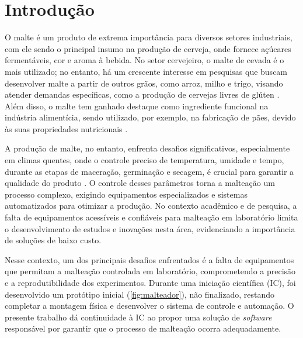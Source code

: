 \chapter[Introdução]{Introdução}

O malte é um produto de extrema importância para diversos setores industriais, com ele sendo o principal insumo na produção de cerveja, onde fornece açúcares fermentáveis, cor e aroma à bebida. No setor cervejeiro, o malte de cevada é o mais utilizado; no entanto, há um crescente interesse em pesquisas que buscam desenvolver malte a partir de outros grãos, como arroz, milho e trigo, visando atender demandas específicas, como a produção de cervejas livres de glúten \cite{CECCARONI2019}. Além disso, o malte tem ganhado destaque como ingrediente funcional na indústria alimentícia, sendo utilizado, por exemplo, na fabricação de pães, devido às suas propriedades nutricionais \cite{KOISTINEN2020}.

A produção de malte, no entanto, enfrenta desafios significativos, especialmente em climas quentes, onde o controle preciso de temperatura, umidade e tempo, durante as etapas de maceração, germinação e secagem, é crucial para garantir a qualidade do produto \cite{KOVALOVA2024}. O controle desses parâmetros torna a malteação um processo complexo, exigindo equipamentos especializados e sistemas automatizados para otimizar a produção. No contexto acadêmico e de pesquisa, a falta de equipamentos acessíveis e confiáveis para malteação em laboratório limita o desenvolvimento de estudos e inovações nesta área, evidenciando a importância de soluções de baixo custo.

Nesse contexto, um dos principais desafios enfrentados é a falta de equipamentos que permitam a malteação controlada em laboratório, comprometendo a precisão e a reprodutibilidade dos experimentos. Durante uma iniciação científica (IC), foi desenvolvido um protótipo inicial (\autoref{fig:malteador}), não finalizado, restando completar a montagem física e desenvolver o sistema de controle e automação. O presente trabalho dá continuidade à IC ao propor uma solução de \textit{software} responsável por garantir que o processo de malteação ocorra adequadamente. 

